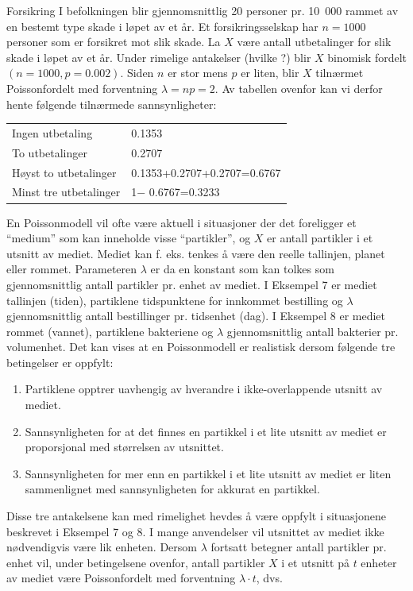 \begin{eksempel}{Forsikring}
I befolkningen blir gjennomsnittlig 20 personer pr. 10\ 000 rammet
av en bestemt type skade i løpet av et år. Et forsikringsselskap
har $n=1000$ personer som er forsikret mot slik skade. La $X$
være antall utbetalinger for slik skade i løpet av et år. Under
rimelige antakelser (hvilke ?) blir $X$ binomisk fordelt
$(n=1000, p=0.002)$. Siden $n$ er stor mens $p$ er liten, blir $X$
tilnærmet Poissonfordelt med forventning $\lambda =np=2$. Av
tabellen ovenfor kan vi derfor hente følgende tilnærmede
sannsynligheter:
\begin{center}
\begin{tabular}{ll}
     Ingen utbetaling       & 0.1353 \\
     To utbetalinger        & 0.2707 \\
     Høyst to utbetalinger &  0.1353+0.2707+0.2707=0.6767 \\
     Minst tre utbetalinger & 1$-$ 0.6767=0.3233
\end{tabular}
\end{center}
\mbox{}
\end{eksempel}
\noindent En Poissonmodell vil ofte være aktuell i situasjoner der det
foreligger et ``medium'' som kan inneholde visse ``partikler'',
og $X$ er antall partikler i et utsnitt av mediet. Mediet kan f.
eks. tenkes å være den reelle tallinjen, planet eller rommet.
Parameteren $\lambda$ er da en konstant som kan tolkes som
gjennomsnittlig antall partikler pr. enhet av mediet. I Eksempel
7 er mediet tallinjen (tiden), partiklene tidspunktene for
innkommet bestilling og $\lambda$ gjennomsnittlig antall
bestillinger pr. tidsenhet (dag). I Eksempel 8 er mediet rommet
(vannet), partiklene bakteriene og $\lambda$ gjennomsnittlig
antall bakterier pr. volumenhet.
Det kan vises at en Poissonmodell er realistisk dersom følgende
tre betingelser er oppfylt:
\begin{enumerate}
\item Partiklene opptrer uavhengig av hverandre i ikke-overlappende
       utsnitt av mediet.
\item Sannsynligheten for at det finnes en partikkel i et lite
     utsnitt av mediet er proporsjonal med størrelsen av
     utsnittet.
\item Sannsynligheten for mer enn en partikkel i et lite utsnitt
     av mediet er liten sammenlignet med sannsynligheten
     for akkurat en partikkel.
\end{enumerate}
\noindent Disse tre antakelsene kan med rimelighet hevdes å være oppfylt i
situa\-sjonene beskrevet i Eksempel 7 og 8.
I mange anvendelser vil utsnittet av mediet ikke nødvendigvis
være lik enheten. Dersom $\lambda$ fortsatt betegner antall
partikler pr. enhet vil, under betingelsene ovenfor, antall
partikler $X$ i et utsnitt på $t$ enheter av mediet være
Poissonfordelt med forventning $\lambda \cdot t$, dvs.

